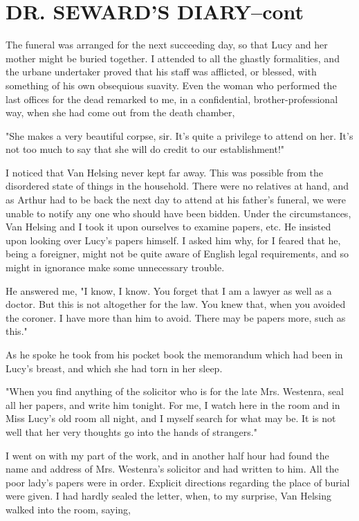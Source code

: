 \chapter{DR. SEWARD'S DIARY--cont}

The funeral was arranged for the next succeeding day, so that Lucy and her mother might be buried together. I attended to all the ghastly formalities, and the urbane undertaker proved that his staff was afflicted, or blessed, with something of his own obsequious suavity. Even the woman who performed the last offices for the dead remarked to me, in a confidential, brother-professional way, when she had come out from the death chamber, 

"She makes a very beautiful corpse, sir. It's quite a privilege to attend on her. It's not too much to say that she will do credit to our establishment!" 

I noticed that Van Helsing never kept far away. This was possible from the disordered state of things in the household. There were no relatives at hand, and as Arthur had to be back the next day to attend at his father's funeral, we were unable to notify any one who should have been bidden. Under the circumstances, Van Helsing and I took it upon ourselves to examine papers, etc. He insisted upon looking over Lucy's papers himself. I asked him why, for I feared that he, being a foreigner, might not be quite aware of English legal requirements, and so might in ignorance make some unnecessary trouble. 

He answered me, "I know, I know. You forget that I am a lawyer as well as a doctor. But this is not altogether for the law. You knew that, when you avoided the coroner. I have more than him to avoid. There may be papers more, such as this." 

As he spoke he took from his pocket book the memorandum which had been in Lucy's breast, and which she had torn in her sleep. 

"When you find anything of the solicitor who is for the late Mrs. Westenra, seal all her papers, and write him tonight. For me, I watch here in the room and in Miss Lucy's old room all night, and I myself search for what may be. It is not well that her very thoughts go into the hands of strangers." 

I went on with my part of the work, and in another half hour had found the name and address of Mrs. Westenra's solicitor and had written to him. All the poor lady's papers were in order. Explicit directions regarding the place of burial were given. I had hardly sealed the letter, when, to my surprise, Van Helsing walked into the room, saying, 

